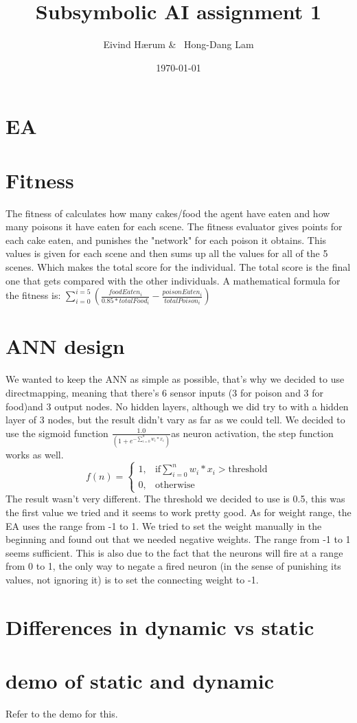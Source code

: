 \documentclass[12pt, a4paper]{article}
\title{Subsymbolic AI assignment 1}
\author{Eivind Hærum \& \ Hong-Dang Lam}
\date{\today} %
\begin{document}
\maketitle
% 
% 
\newpage

\tableofcontents
{}
\newpage

\section{EA}

\section{Fitness}
The fitness of calculates how many cakes/food the agent have eaten and how many poisons it have eaten for each scene. The fitness evaluator gives points for each cake eaten, and punishes the "network" for each poison it obtains. This values is given for each scene and then sums up all the values for all of the 5 scenes. Which makes the total score for the individual. The total score is the final one that gets compared with the other individuals.
A mathematical formula for the fitness is:
$ \sum_{i=0}^{i =5}({\frac{foodEaten_i}{0.85 * totalFood_i} - \frac{poisonEaten_i}{totalPoison_i}}) $

\section{ANN design}
We wanted to keep the ANN as simple as possible, that's why we decided to use directmapping, meaning that there's 6 sensor inputs (3 for poison and 3 for food)and 3 output nodes. No hidden layers, although we did try to with a hidden layer of 3 nodes, but the result didn't vary as far as we could tell.
We decided to use the sigmoid function $ \frac{1.0}
{(1+e^ {-\sum_{i = 0}^{n}{w_i * x_i}})} $as neuron activation, the step function works as well.  $$
f(n) =
\begin{cases}
1, & \text{if} \sum_{i = 0}^{n}{w_i * x_i}>\text{threshold} \\
0, & \text{otherwise }
\end{cases}
$$
The result wasn't very different.
The threshold we decided to use is 0.5, this was the first value we tried and it seems to work pretty good. As for weight range, the EA uses the range from -1 to 1. We tried to set the weight manually in the beginning and found out that we needed negative weights. The range from -1 to 1 seems sufficient. This is also due to the fact that the neurons will fire at a range from 0 to 1, the only way to negate a fired neuron (in the sense of punishing its values, not ignoring it) is to set the connecting weight to -1.

\section{Differences in dynamic vs static}

\section{demo of static and dynamic}
Refer to the demo for this.
\end{document}
